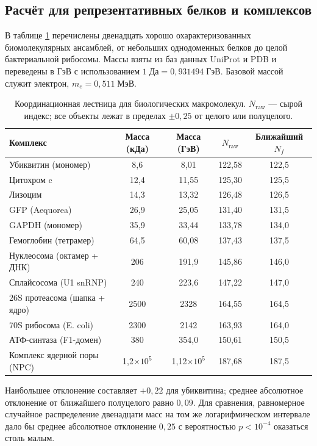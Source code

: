 \documentclass[12pt,a4paper]{article}
\begin{document}
	\subsection{Расчёт для репрезентативных белков и комплексов}
	
	В таблице \ref{tab:protein_masses} перечислены двенадцать хорошо охарактеризованных биомолекулярных ансамблей, от небольших однодоменных белков до целой бактериальной рибосомы. Массы взяты из баз данных UniProt и PDB и переведены в ГэВ с использованием \(1\;\text{Да} = 0,931494\;\text{ГэВ}\). Базовой массой служит электрон, \(m_e = 0,511\;\text{МэВ}\).
	
	\begin{table}[H]
		\centering
		\caption{Координационная лестница для биологических макромолекул. \(N_{\mathrm{raw}}\) — сырой индекс; все объекты лежат в пределах \(\pm 0,25\) от целого или полуцелого.}
		\label{tab:protein_masses}
		\small
		\begin{tabular}{l c c c c}
			\toprule
			Комплекс & Масса (кДа) & Масса (ГэВ) & \(N_{\mathrm{raw}}\) & Ближайший \(N_f\) \\
			\midrule
			Убиквитин (мономер)          & 8,6   & 8,01  & 122,58 & 122,5 \\
			Цитохром c                 & 12,4  & 11,55 & 125,30 & 125,5 \\
			Лизоцим                     & 14,3  & 13,32 & 126,48 & 126,5 \\
			GFP (Aequorea)               & 26,9  & 25,05 & 131,40 & 131,5 \\
			GAPDH (мономер)              & 35,9  & 33,44 & 133,78 & 134,0 \\
			Гемоглобин (тетрамер)       & 64,5  & 60,08 & 137,43 & 137,5 \\
			Нуклеосома (октамер + ДНК)   & 206   & 191,9 & 145,86 & 146,0 \\
			Сплайсосома (U1 snRNP)       & 240   & 223,6 & 147,22 & 147,0 \\
			26S протеасома (шапка + ядро)  & 2500  & 2328  & 164,55 & 164,5 \\
			70S рибосома (E. coli)       & 2300  & 2142  & 163,93 & 164,0 \\
			АТФ-синтаза (F1-домен)     & 380   & 354,0 & 150,61 & 150,5 \\
			Комплекс ядерной поры (NPC)   & 1,2\(\times10^5\) & 1,12\(\times10^5\) & 187,68 & 187,5 \\
			\bottomrule
		\end{tabular}
		\par\smallskip
		\footnotesize
		Наибольшее отклонение составляет \(+0,22\) для убиквитина; среднее абсолютное отклонение от ближайшего полуцелого равно \(0,09\). Для сравнения, равномерное случайное распределение двенадцати масс на том же логарифмическом интервале дало бы среднее абсолютное отклонение \(0,25\) с вероятностью \(p < 10^{-4}\) оказаться столь малым.
	\end{table}
	
\end{document}

